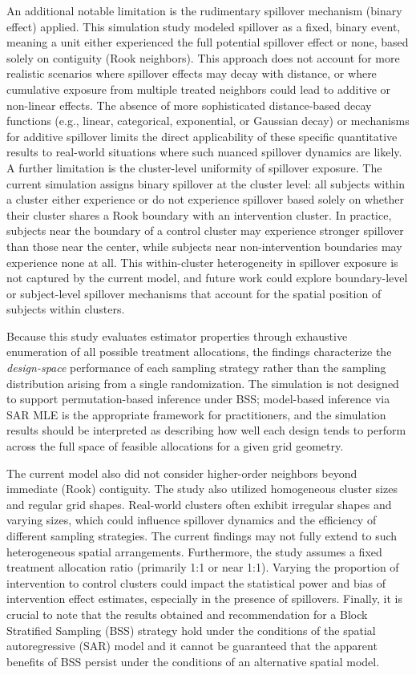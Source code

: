 \documentclass{article}[11pt]
\begin{document}
An additional notable limitation is the rudimentary spillover mechanism (binary effect) applied. This simulation study modeled spillover as a fixed, binary event, meaning a unit either experienced the full potential spillover effect or none, based solely on contiguity (Rook neighbors). This approach does not account for more realistic scenarios where spillover effects may decay with distance, or where cumulative exposure from multiple treated neighbors could lead to additive or non-linear effects. The absence of more sophisticated distance-based decay functions (e.g., linear, categorical, exponential, or Gaussian decay) or mechanisms for additive spillover limits the direct applicability of these specific quantitative results to real-world situations where such nuanced spillover dynamics are likely. %
A further limitation is the cluster-level uniformity of spillover exposure. The current simulation assigns binary spillover at the cluster level: all subjects within a cluster either experience or do not experience spillover based solely on whether their cluster shares a Rook boundary with an intervention cluster. In practice, subjects near the boundary of a control cluster may experience stronger spillover than those near the center, while subjects near non-intervention boundaries may experience none at all. This within-cluster heterogeneity in spillover exposure is not captured by the current model, and future work could explore boundary-level or subject-level spillover mechanisms that account for the spatial position of subjects within clusters.

Because this study evaluates estimator properties through exhaustive enumeration of all possible treatment allocations, the findings characterize the \emph{design-space} performance of each sampling strategy rather than the sampling distribution arising from a single randomization. The simulation is not designed to support permutation-based inference under BSS; model-based inference via SAR MLE is the appropriate framework for practitioners, and the simulation results should be interpreted as describing how well each design tends to perform across the full space of feasible allocations for a given grid geometry.

The current model also did not consider higher-order neighbors beyond immediate (Rook) contiguity. The study also utilized homogeneous cluster sizes and regular grid shapes. Real-world clusters often exhibit irregular shapes and varying sizes, which could influence spillover dynamics and the efficiency of different sampling strategies. The current findings may not fully extend to such heterogeneous spatial arrangements. Furthermore, the study assumes a fixed treatment allocation ratio (primarily 1:1 or near 1:1). Varying the proportion of intervention to control clusters could impact the statistical power and bias of intervention effect estimates, especially in the presence of spillovers. Finally, it is crucial to note that the results obtained and recommendation for a Block Stratified Sampling (BSS) strategy hold under the conditions of the spatial autoregressive (SAR) model and it cannot be guaranteed that the apparent benefits of BSS persist under the conditions of an alternative spatial model.
\end{document}

